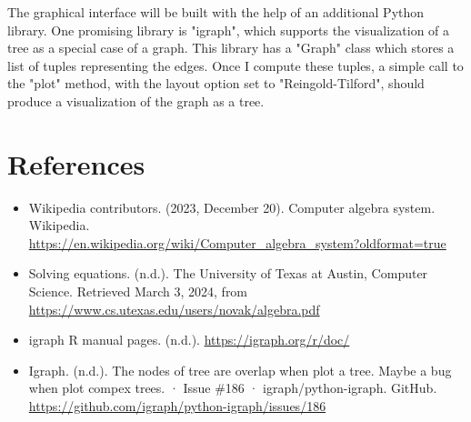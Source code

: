 \documentclass[11pt]{article}
\begin{document}
The graphical interface will be built with the help of an additional Python library. One promising library is "igraph", which supports the visualization of a tree as a special case of a graph. This library has a "Graph" class which stores a list of tuples representing the edges. Once I compute these tuples, a simple call to the "plot" method, with the layout option set to "Reingold-Tilford", should produce a visualization of the graph as a tree.

\section*{References}

\begin{itemize}
\item Wikipedia contributors. (2023, December 20). Computer algebra system. Wikipedia. \\
    \href{https://en.wikipedia.org/wiki/Computer_algebra_system?oldformat=true}{https://en.wikipedia.org/wiki/Computer_algebra_system?oldformat=true}
\item Solving equations. (n.d.). The University of Texas at Austin, Computer Science. Retrieved March 3, 2024, from \href{https://www.cs.utexas.edu/users/novak/algebra.pdf}{https://www.cs.utexas.edu/users/novak/algebra.pdf}
\item igraph R manual pages. (n.d.). \href{https://igraph.org/r/doc/}{https://igraph.org/r/doc/}
\item Igraph. (n.d.). The nodes of tree are overlap when plot a tree. Maybe a bug when plot compex trees. · Issue \#186 · igraph/python-igraph. GitHub. \href{https://github.com/igraph/python-igraph/issues/186}{https://github.com/igraph/python-igraph/issues/186}
\end{itemize}






\end{document}
